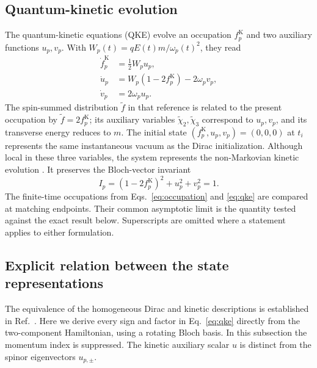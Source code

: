 \documentclass[11pt,a4paper]{article}
\begin{document}
\subsection{Quantum-kinetic evolution}

The quantum-kinetic equations (QKE) evolve an occupation $f_p^{\mathrm K}$ and two auxiliary functions $u_p,v_p$. With $W_p(t)=qE(t)m/\omega_p(t)^2$, they read \cite[Eqs.~(48)--(50)]{Hebenstreit2010}
\begin{align}
  \dot f_p^{\mathrm K} &= \frac{1}{2}W_p u_p, \nonumber\\
  \dot u_p &= W_p(1-2f_p^{\mathrm K})-2\omega_p v_p, \label{eq:qke}\\
  \dot v_p &= 2\omega_p u_p. \nonumber
\end{align}
The spin-summed distribution $\widetilde f$ in that reference is related to the present occupation by $\widetilde f=2f_p^{\mathrm K}$; its auxiliary variables $\widetilde\chi_2,\widetilde\chi_3$ correspond to $u_p,v_p$, and its transverse energy reduces to $m$. The initial state $(f_p^{\mathrm K},u_p,v_p)=(0,0,0)$ at $t_i$ represents the same instantaneous vacuum as the Dirac initialization. Although local in these three variables, the system represents the non-Markovian kinetic evolution \cite{Schmidt1998,Dumlu2009,LiGong2021}. It preserves the Bloch-vector invariant
\begin{equation}
  I_p=(1-2f_p^{\mathrm K})^2+u_p^2+v_p^2=1.
  \label{eq:invariant}
\end{equation}
The finite-time occupations from Eqs.~\eqref{eq:occupation} and \eqref{eq:qke} are compared at matching endpoints. Their common asymptotic limit is the quantity tested against the exact result below. Superscripts are omitted where a statement applies to either formulation.

\subsection{Explicit relation between the state representations}
\label{sec:mapping}

The equivalence of the homogeneous Dirac and kinetic descriptions is established in Ref.~\cite[Sec.~II.A]{LiGong2021}. Here we derive every sign and factor in Eq.~\eqref{eq:qke} directly from the two-component Hamiltonian, using a rotating Bloch basis. In this subsection the momentum index is suppressed. The kinetic auxiliary scalar $u$ is distinct from the spinor eigenvectors $u_{p,\pm}$.
\end{document}
